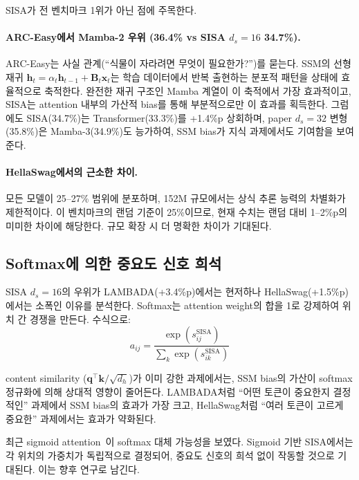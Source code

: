 \documentclass[11pt]{article}
\begin{document}
SISA가 전 벤치마크 1위가 아닌 점에 주목한다.

\paragraph{ARC-Easy에서 Mamba-2 우위 (36.4\% vs SISA $d_s=16$ 34.7\%).} ARC-Easy는 사실 관계(``식물이 자라려면 무엇이 필요한가?'')를 묻는다. SSM의 선형 재귀 $\mathbf{h}_t = \alpha_t \mathbf{h}_{t-1} + \mathbf{B}_t \mathbf{x}_t$는 학습 데이터에서 반복 출현하는 분포적 패턴을 상태에 효율적으로 축적한다. 완전한 재귀 구조인 Mamba 계열이 이 축적에서 가장 효과적이고, SISA는 attention 내부의 가산적 bias를 통해 부분적으로만 이 효과를 획득한다. 그럼에도 SISA(34.7\%)는 Transformer(33.3\%)를 +1.4\%p 상회하며, paper $d_s=32$ 변형(35.8\%)은 Mamba-3(34.9\%)도 능가하여, SSM bias가 지식 과제에서도 기여함을 보여준다.

\paragraph{HellaSwag에서의 근소한 차이.} 모든 모델이 25--27\% 범위에 분포하며, 152M 규모에서는 상식 추론 능력의 차별화가 제한적이다. 이 벤치마크의 랜덤 기준이 25\%이므로, 현재 수치는 랜덤 대비 1--2\%p의 미미한 차이에 해당한다. 규모 확장 시 더 명확한 차이가 기대된다.

\subsection{Softmax에 의한 중요도 신호 희석}

SISA $d_s = 16$의 우위가 LAMBADA(+3.4\%p)에서는 현저하나 HellaSwag(+1.5\%p)에서는 소폭인 이유를 분석한다. Softmax는 attention weight의 합을 1로 강제하여 위치 간 경쟁을 만든다. 수식으로:
\begin{equation}
a_{ij} = \frac{\exp(s_{ij}^{\text{SISA}})}{\sum_k \exp(s_{ik}^{\text{SISA}})}
\end{equation}

content similarity ($\mathbf{q}^\top \mathbf{k} / \sqrt{d_h}$)가 이미 강한 과제에서는, SSM bias의 가산이 softmax 정규화에 의해 상대적 영향이 줄어든다. LAMBADA처럼 ``어떤 토큰이 중요한지 결정적인'' 과제에서 SSM bias의 효과가 가장 크고, HellaSwag처럼 ``여러 토큰이 고르게 중요한'' 과제에서는 효과가 약화된다.

최근 sigmoid attention~\citep{sigmoid_attn}이 softmax 대체 가능성을 보였다. Sigmoid 기반 SISA에서는 각 위치의 가중치가 독립적으로 결정되어, 중요도 신호의 희석 없이 작동할 것으로 기대된다. 이는 향후 연구로 남긴다.
\end{document}
